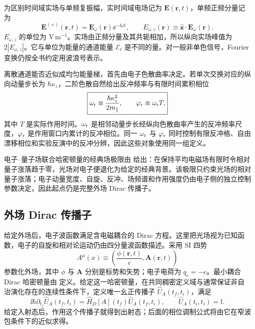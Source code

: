 为区别时间域实场与单频复振幅，实时间域电场记为 $\mathbf E(\mathbf r,t)$，单频正频分量记为
\begin{equation*}
 \mathbf E^{(+)}(\mathbf r,t)=\mathbf E_\omega(\mathbf r)\ee^{-\ii\omega t},
 \qquad
 E_{\omega,z}(\mathbf r)\equiv\hat{\mathbf z}\cdot\mathbf E_\omega(\mathbf r).
\end{equation*}
$E_{\omega,z}$ 的单位为 $\mathrm{V\,m^{-1}}$。实场由正频分量及其共轭相加，所以纵向实场峰值为 $2|E_{\omega,z}|$。它与单位为能量的通道能量 $\mathcal E_\ell$ 是不同的量。对一般非单色信号，Fourier 变换仍按全书约定用波浪号表示。

离散通道能否近似成均匀能量梯，首先由电子色散曲率决定。若单次交换对应的纵向动量步长为 $\hbar \kappa_z$，二阶色散自然给出反冲频率与有限时间累积相位
\begin{equation}
\boxed{
\omega_{\rm r}\equiv\frac{\hbar \kappa_z^2}{2m_\parallel},\qquad
\varphi_{\rm r}\equiv\omega_{\rm r}T,}
\label{eq:pinem_recoil_frequency_master}
\end{equation}
其中 $T$ 是实际作用时间。$\omega_{\rm r}$ 是相邻动量步长经纵向色散曲率产生的反冲频率尺度，$\varphi_{\rm r}$ 是作用窗口内累计的反冲相位。同一 $\omega_{\rm r}$ 与 $\varphi_{\rm r}$ 同时控制有限反冲格、自由漂移相位和实验反演中的反冲分辨，因此这些对象使用同一组定义。

电子--量子场联合哈密顿量的经典场极限由 给出：在保持平均电磁场有限时令相对量子涨落趋于零，光场对电子便退化为给定的经典背景。该极限只约束光场的相对量子涨落；电子动量宽度、自旋、反冲、场频谱和作用强度仍由电子侧的独立控制参数决定，因此起点仍是完整外场 Dirac 传播子。

\subsection{外场 Dirac 传播子}

给定外场后，电子波函数满足含电磁耦合的 Dirac 方程。这里把光场视为已知函数，电子的自旋和相对论运动仍由四分量波函数描述。采用 SI 四势
\begin{equation*}
A^\mu(x)\equiv\left(\frac{\phi(\mathbf r,t)}{c},\mathbf A(\mathbf r,t)\right)
\end{equation*}
参数化外场，其中 $\phi$ 与 $\mathbf A$ 分别是标势和矢势；电子电荷为 $q_{\mathrm e}=-e$。最小耦合 Dirac 哈密顿量由 定义。给定这一哈密顿量，在共同稠密定义域与通常保证非自治演化存在的连续性条件下，定义唯一幺正传播子 $\hat U_A(t_f,t_i)$，满足
\begin{equation}
\boxed{
\ii\hbar\partial_{t_f}\hat U_A(t_f,t_i)
=\hat H_D[A](t_f)\hat U_A(t_f,t_i),
\qquad
\hat U_A(t_i,t_i)=\mathbb I.}
\label{eq:exact_external_field_evolution}
\end{equation}
给定入射态后，作用这个传播子就得到出射态；后面的相位调制公式将由它在窄波包条件下的近似求得。

